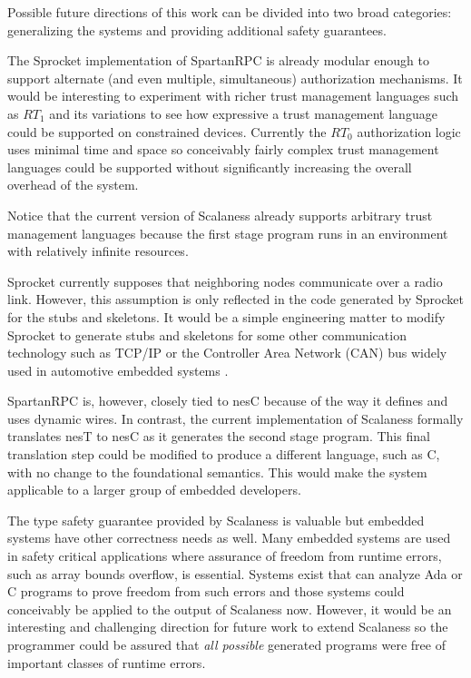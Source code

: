 Possible future directions of this work can be divided into two broad categories: generalizing
the systems and providing additional safety guarantees.

The Sprocket implementation of SpartanRPC is already modular enough to support alternate (and
even multiple, simultaneous) authorization mechanisms. It would be interesting to experiment
with richer trust management languages such as $RT_1$ and its variations to see how expressive a
trust management language could be supported on constrained devices. Currently the $RT_0$
authorization logic uses minimal time and space so conceivably fairly complex trust management
languages could be supported without significantly increasing the overall overhead of the
system.

Notice that the current version of Scalaness already supports arbitrary trust management
languages because the first stage program runs in an environment with relatively infinite
resources.

Sprocket currently supposes that neighboring nodes communicate over a radio link. However, this
assumption is only reflected in the code generated by Sprocket for the stubs and skeletons. It
would be a simple engineering matter to modify Sprocket to generate stubs and skeletons for some
other communication technology such as TCP/IP or the Controller Area Network (CAN) bus widely
used in automotive embedded systems \cite{pazul1999controller}.

SpartanRPC is, however, closely tied to nesC because of the way it defines and uses dynamic
wires. In contrast, the current implementation of Scalaness formally translates nesT to nesC as
it generates the second stage program. This final translation step could be modified to produce
a different language, such as C, with no change to the foundational semantics. This would make
the system applicable to a larger group of embedded developers.

The type safety guarantee provided by Scalaness is valuable but embedded systems have other
correctness needs as well. Many embedded systems are used in safety critical applications where
assurance of freedom from runtime errors, such as array bounds overflow, is essential. Systems
exist that can analyze Ada or C programs to prove freedom from such errors
\cite{Barnes:2000:SWC:369264.369271,Cuoq:2012:FSA:2404232.2404250} and those systems could
conceivably be applied to the output of Scalaness now. However, it would be an interesting and
challenging direction for future work to extend Scalaness so the programmer could be assured
that \emph{all possible} generated programs were free of important classes of runtime errors.

